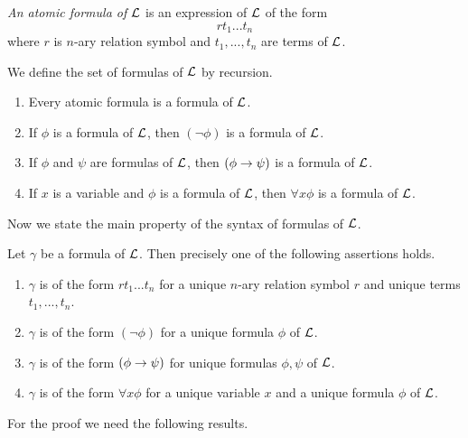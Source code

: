 \begin{definition}
\textit{An atomic formula of ${\mathcal L}$} is an expression of ${\mathcal L}$ of the form
$$rt_1...t_n$$
where $r$ is $n$-ary relation symbol and $t_1, ...,t_n$ are terms of ${\mathcal L}$.
\end{definition}

\begin{definition}
We define the set of formulas of ${\mathcal L}$ by recursion.
\begin{enumerate}[label=\textbf{(\arabic*)}, leftmargin=3.0em]
\item Every atomic formula is a formula of ${\mathcal L}$.
\item If $\phi$ is a formula of ${\mathcal L}$, then $(\neg \phi)$ is a formula of ${\mathcal L}$.
\item If $\phi$ and $\psi$ are formulas of ${\mathcal L}$, then $(\phi\rightarrow \psi)$ is a formula of ${\mathcal L}$.
\item If $x$ is a variable and $\phi$ is a formula of ${\mathcal L}$, then $\forall x\phi$ is a formula of ${\mathcal L}$.
\end{enumerate}
\end{definition}
\noindent
Now we state the main property of the syntax of formulas of ${\mathcal L}$.

\begin{theorem}\label{theorem:unique_readability_of_formulas}
Let $\gamma$ be a formula of ${\mathcal L}$. Then precisely one of the following assertions holds.
\begin{enumerate}[label=\textbf{\emph{(\arabic*)}}, leftmargin=3.0em]
\item $\gamma$ is of the form $rt_1...t_n$ for a unique $n$-ary relation symbol $r$ and unique terms $t_1 , ..., t_n$.
\item $\gamma$ is of the form $(\neg \phi)$ for a unique formula $\phi$ of ${\mathcal L}$.
\item $\gamma$ is of the form $(\phi \rightarrow \psi)$ for unique formulas $\phi, \psi$ of ${\mathcal L}$.
\item $\gamma$ is of the form $\forall x \phi$ for a unique variable $x$ and a unique formula $\phi$ of ${\mathcal L}$.
\end{enumerate}
\end{theorem}
\noindent
For the proof we need the following results.

